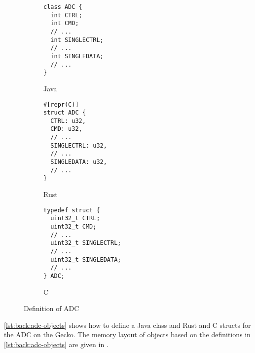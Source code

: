 \begin{figure}[H]
  \centering
  \begin{subfigure}{0.31\textwidth}
    \begin{verbatim}
class ADC {
  int CTRL;
  int CMD;
  // ...
  int SINGLECTRL;
  // ...
  int SINGLEDATA;
  // ...
}
    \end{verbatim}
    \caption{Java}
    \label{fig:back:adc-objects:java}
  \end{subfigure}
  \hfill
  \begin{subfigure}{0.31\textwidth}
    \begin{verbatim}
#[repr(C)]
struct ADC {
  CTRL: u32,
  CMD: u32,
  // ...
  SINGLECTRL: u32,
  // ...
  SINGLEDATA: u32,
  // ...
}
    \end{verbatim}
    \caption{Rust}
    \label{fig:back:adc-objects:rust}
  \end{subfigure}
  \hfill
  \begin{subfigure}{0.31\textwidth}
    \begin{verbatim}
typedef struct {
  uint32_t CTRL;
  uint32_t CMD;
  // ...
  uint32_t SINGLECTRL;
  // ...
  uint32_t SINGLEDATA;
  // ...
} ADC;
    \end{verbatim}
    \caption{C}
    \label{fig:back:adc-objects:c}
  \end{subfigure}

  \caption{Definition of ADC}
  \label{list:back:adc-objects}
\end{figure}

\autoref{lst:back:adc-objects} shows how to define a Java class and Rust and C structs for the ADC on the Gecko.
The memory layout of objects based on the definitions in \autoref{lst:back:adc-objects} are given in \label{fig:back:memlayout}.

